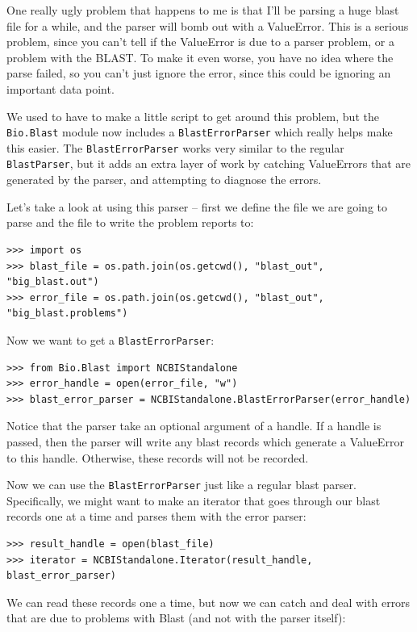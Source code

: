 \documentclass{report}
\begin{document}
One really ugly problem that happens to me is that I'll be parsing a huge blast file for a while, and the parser will bomb out with a ValueError. This is a serious problem, since you can't tell if the ValueError is due to a parser problem, or a problem with the BLAST. To make it even worse, you have no idea where the parse failed, so you can't just ignore the error, since this could be ignoring an important data point.

We used to have to make a little script to get around this problem, but the \verb|Bio.Blast| module now includes a \verb|BlastErrorParser| which really helps make this easier. The \verb|BlastErrorParser| works very similar to the regular \verb|BlastParser|, but it adds an extra layer of work by catching ValueErrors that are generated by the parser, and attempting to diagnose the errors.

Let's take a look at using this parser -- first we define the file we are going to parse and the file to write the problem reports to:

\begin{verbatim}
>>> import os
>>> blast_file = os.path.join(os.getcwd(), "blast_out", "big_blast.out")
>>> error_file = os.path.join(os.getcwd(), "blast_out", "big_blast.problems")
\end{verbatim}

Now we want to get a \verb|BlastErrorParser|:

\begin{verbatim}
>>> from Bio.Blast import NCBIStandalone
>>> error_handle = open(error_file, "w")
>>> blast_error_parser = NCBIStandalone.BlastErrorParser(error_handle)
\end{verbatim}

Notice that the parser take an optional argument of a handle. If a handle is passed, then the parser will write any blast records which generate a ValueError to this handle. Otherwise, these records will not be recorded.

Now we can use the \verb|BlastErrorParser| just like a regular blast parser. Specifically, we might want to make an iterator that goes through our blast records one at a time and parses them with the error parser:

\begin{verbatim}
>>> result_handle = open(blast_file)
>>> iterator = NCBIStandalone.Iterator(result_handle, blast_error_parser)
\end{verbatim}

We can read these records one a time, but now we can catch and deal with errors that are due to problems with Blast (and not with the parser itself):
\end{document}
